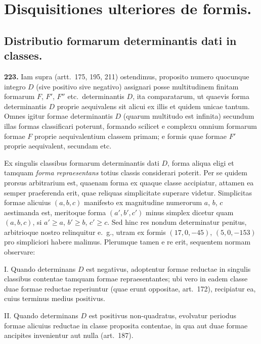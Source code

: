 \documentclass[12pt,a4paper]{article}
\theoremstyle{plain}
\theoremstyle{definition}
\theoremstyle{remark}
\begin{document}
\section*{Disquisitiones ulteriores de formis.}

\subsection*{Distributio formarum determinantis dati in classes.}

\textbf{223.}
Iam supra (artt.\ 175, 195, 211) ostendimus, proposito numero quocunque integro $D$ (sive positivo sive negativo) assignari posse multitudinem finitam formarum $F$, $F'$, $F''$ etc.\ determinantis $D$, ita comparatarum, ut quaevis forma determinantis $D$ proprie aequivalens sit alicui ex illis et quidem unicae tantum. Omnes igitur formae determinantis $D$ (quarum multitudo est infinita) secundum illas formas classificari poterunt, formando scilicet e complexu omnium formarum formae $F$ proprie aequivalentium classem primam; e formis quae formae $F'$ proprie aequivalent, secundam etc.

Ex singulis classibus formarum determinantis dati $D$, forma aliqua eligi et tamquam \emph{forma repraesentans} totius classis considerari poterit. Per se quidem prorsus arbitrarium est, quaenam forma ex quaque classe accipiatur, attamen ea semper praeferenda erit, quae reliquas simplicitate superare videtur. Simplicitas formae alicuius $(a,b,c)$ manifesto ex magnitudine numerorum $a$, $b$, $c$ aestimanda est, meritoque forma $(a',b',c')$ minus simplex dicetur quam $(a,b,c)$, si $a'\geq a$, $b'\geq b$, $c'\geq c$. Sed hinc res nondum determinatur penitus, arbitrioque nostro relinquitur e.\ g., utram ex formis $(17,0,-45)$, $(5,0,-153)$ pro simpliciori habere malimus. Plerumque tamen e re erit, sequentem normam observare:

I. Quando determinans $D$ est negativus, adoptentur formae reductae in singulis classibus contentae tamquam formae repraesentantes; ubi vero in eadem classe duae formae reductae reperiuntur (quae erunt oppositae, art.\ 172), recipiatur ea, cuius terminus medius positivus.

II. Quando determinans $D$ est positivus non-quadratus, evolvatur periodus formae alicuius reductae in classe proposita contentae, in qua aut duae formae ancipites invenientur aut nulla (art.\ 187).
\end{document}
